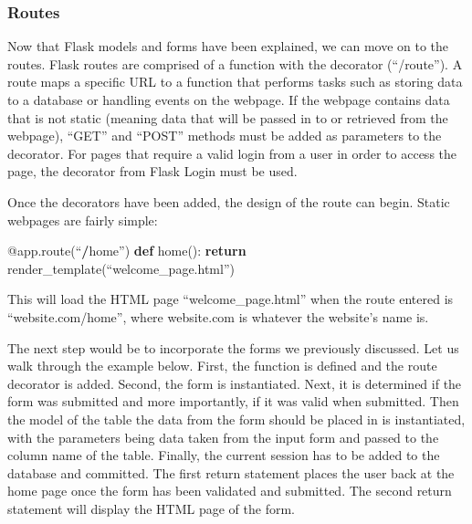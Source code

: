 \documentclass[]{book}
\newenvironment{Shaded}{\begin{snugshade}}{\end{snugshade}}
\newcommand{\KeywordTok}[1]{\textcolor[rgb]{0.13,0.29,0.53}{\textbf{#1}}}
\newcommand{\ControlFlowTok}[1]{\textcolor[rgb]{0.13,0.29,0.53}{\textbf{#1}}}
\newcommand{\OperatorTok}[1]{\textcolor[rgb]{0.81,0.36,0.00}{\textbf{#1}}}
\newcommand{\AttributeTok}[1]{\textcolor[rgb]{0.77,0.63,0.00}{#1}}
\newcommand{\NormalTok}[1]{#1}
\begin{document}
\subsubsection{Routes}\label{routes}

Now that Flask models and forms have been explained, we can move on to
the routes. Flask routes are comprised of a function with the decorator
\citet{app.route}(``/route''). A route maps a specific URL to a function
that performs tasks such as storing data to a database or handling
events on the webpage. If the webpage contains data that is not static
(meaning data that will be passed in to or retrieved from the webpage),
``GET'' and ``POST'' methods must be added as parameters to the
decorator. For pages that require a valid login from a user in order to
access the page, the decorator \citet{login_required} from Flask Login
must be used.

Once the decorators have been added, the design of the route can begin.
Static webpages are fairly simple:

\begin{Shaded}
\begin{Highlighting}[]
\AttributeTok{@app.route}\NormalTok{(“}\OperatorTok{/}\NormalTok{home”)}
\KeywordTok{def}\NormalTok{ home():}
\ControlFlowTok{return}\NormalTok{ render_template(“welcome_page.html”)}
\end{Highlighting}
\end{Shaded}

This will load the HTML page ``welcome\_page.html'' when the route
entered is ``website.com/home'', where website.com is whatever the
website's name is.

The next step would be to incorporate the forms we previously discussed.
Let us walk through the example below. First, the function is defined
and the route decorator is added. Second, the form is instantiated.
Next, it is determined if the form was submitted and more importantly,
if it was valid when submitted. Then the model of the table the data
from the form should be placed in is instantiated, with the parameters
being data taken from the input form and passed to the column name of
the table. Finally, the current session has to be added to the database
and committed. The first return statement places the user back at the
home page once the form has been validated and submitted. The second
return statement will display the HTML page of the form.
\end{document}

